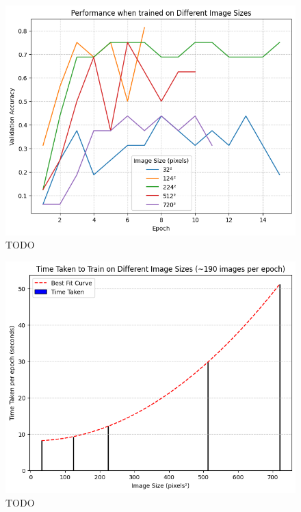             \begin{figure}[h]
                \centering
                \includegraphics[width=\textwidth]{images/CNNSize_Perf.png}
                \caption{TODO}
                \label{fig:CNNSize_Perf}
            \end{figure}
    
            \begin{figure}[h]
                \centering
                \includegraphics[width=\textwidth]{images/CNNSize_Time.png}
                \caption{TODO}
                \label{fig:CNNSize_Time}
            \end{figure}
      

